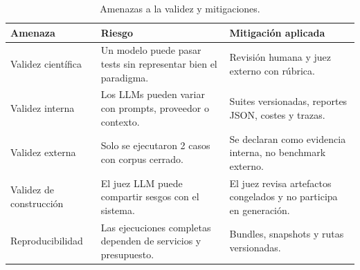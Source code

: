 \begin{table}[H]
\begin{center}
\small
\begin{tabular}{|p{3cm}|p{4.9cm}|p{4.5cm}|} \hline
\textbf{Amenaza} & \textbf{Riesgo} & \textbf{Mitigación aplicada} \\ \hline
Validez científica & Un modelo puede pasar tests sin representar bien el paradigma. & Revisión humana y juez externo con rúbrica. \\ \hline
Validez interna & Los LLMs pueden variar con prompts, proveedor o contexto. & Suites versionadas, reportes JSON, costes y trazas. \\ \hline
Validez externa & Solo se ejecutaron 2 casos con corpus cerrado. & Se declaran como evidencia interna, no benchmark externo. \\ \hline
Validez de construcción & El juez LLM puede compartir sesgos con el sistema. & El juez revisa artefactos congelados y no participa en generación. \\ \hline
Reproducibilidad & Las ejecuciones completas dependen de servicios y presupuesto. & Bundles, snapshots y rutas versionadas. \\ \hline
\end{tabular}
\caption{Amenazas a la validez y mitigaciones.}
\end{center}
\end{table}
